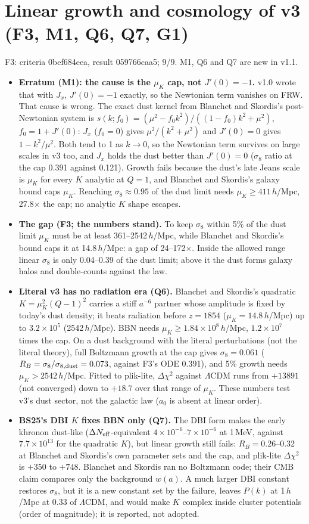 \documentclass[10pt]{article}
\begin{document}
\section{Linear growth and cosmology of v3 (F3, M1, Q6, Q7, G1)}
F3: criteria 0bef684eea, result 059766caa5; 9/9. M1, Q6 and Q7 are new in v1.1.
\begin{itemize}
\item \textbf{Erratum (M1): the cause is the $\mu_K$ cap, not $J'(0)=-1$.} v1.0 wrote that with $J_x$, $J'(0)=-1$ exactly, so the Newtonian term vanishes on FRW. That cause is wrong. The exact dust kernel from Blanchet and Skordis's post-Newtonian system is $s(k;f_0)=(\mu^2-f_0k^2)/((1-f_0)k^2+\mu^2)$, $f_0=1+J'(0)$: $J_x$ ($f_0=0$) gives $\mu^2/(k^2+\mu^2)$ and $J'(0)=0$ gives $1-k^2/\mu^2$. Both tend to 1 as $k\to0$, so the Newtonian term survives on large scales in v3 too, and $J_x$ holds the dust better than $J'(0)=0$ ($\sigma_8$ ratio at the cap 0.391 against 0.121). Growth fails because the dust's late Jeans scale is $\mu_K$ for every $K$ analytic at $Q=1$, and Blanchet and Skordis's galaxy bound caps $\mu_K$. Reaching $\sigma_8\approx0.95$ of the dust limit needs $\mu_K\ge411\,h$/Mpc, 27.8$\times$ the cap; no analytic $K$ shape escapes.
\item \textbf{The gap (F3; the numbers stand).} To keep $\sigma_8$ within 5\% of the dust limit $\mu_K$ must be at least 361--2542\,$h$/Mpc, while Blanchet and Skordis's bound caps it at 14.8\,$h$/Mpc: a gap of 24--172$\times$. Inside the allowed range linear $\sigma_8$ is only 0.04--0.39 of the dust limit; above it the dust forms galaxy halos and double-counts against the law.
\item \textbf{Literal v3 has no radiation era (Q6).} Blanchet and Skordis's quadratic $K=\mu_K^2(Q-1)^2$ carries a stiff $a^{-6}$ partner whose amplitude is fixed by today's dust density; it beats radiation before $z=1854$ ($\mu_K=14.8\,h$/Mpc) up to $3.2\times10^{5}$ (2542\,$h$/Mpc). BBN needs $\mu_K\ge1.84\times10^{8}\,h$/Mpc, $1.2\times10^{7}$ times the cap. On a dust background with the literal perturbations (not the literal theory), full Boltzmann growth at the cap gives $\sigma_8=0.061$ ($R_B=\sigma_8/\sigma_{8,\rm dust}=0.073$, against F3's ODE 0.391), and 5\% growth needs $\mu_K>2542\,h$/Mpc. Fitted to plik-lite, $\Delta\chi^2$ against $\Lambda$CDM runs from $+13891$ (not converged) down to $+18.7$ over that range of $\mu_K$. These numbers test v3's dust sector, not the galactic law ($a_0$ is absent at linear order).
\item \textbf{BS25's DBI $K$ fixes BBN only (Q7).} The DBI form makes the early khronon dust-like ($\Delta N_{\rm eff}$-equivalent $4\times10^{-6}$--$7\times10^{-6}$ at 1\,MeV, against $7.7\times10^{13}$ for the quadratic $K$), but linear growth still fails: $R_B=0.26$--0.32 at Blanchet and Skordis's own parameter sets and the cap, and plik-lite $\Delta\chi^2$ is $+350$ to $+748$. Blanchet and Skordis ran no Boltzmann code; their CMB claim compares only the background $w(a)$. A much larger DBI constant restores $\sigma_8$, but it is a new constant set by the failure, leaves $P(k)$ at 1\,$h$/Mpc at 0.33 of $\Lambda$CDM, and would make $K$ complex inside cluster potentials (order of magnitude); it is reported, not adopted.

\end{itemize}
\end{document}
